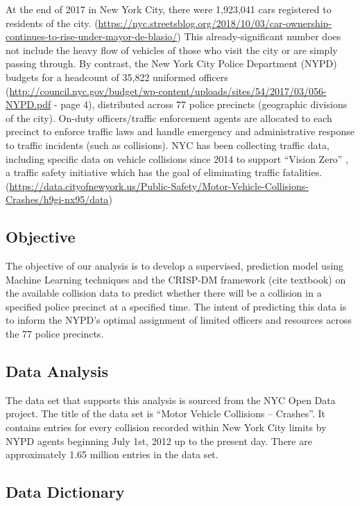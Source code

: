 At the end of 2017 in New York City, there were 1,923,041 cars
registered to residents of the city.
(\url{https://nyc.streetsblog.org/2018/10/03/car-ownership-continues-to-rise-under-mayor-de-blasio/})
This already-significant number does not include the heavy flow of
vehicles of those who visit the city or are simply passing through. By
contrast, the New York City Police Department (NYPD) budgets for a
headcount of 35,822 uniformed officers
(\url{http://council.nyc.gov/budget/wp-content/uploads/sites/54/2017/03/056-NYPD.pdf}
- page 4), distributed across 77 police precincts (geographic divisions
of the city). On-duty officers/traffic enforcement agents are allocated
to each precinct to enforce traffic laws and handle emergency and
administrative response to traffic incidents (such as collisions). NYC
has been collecting traffic data, including specific data on vehicle
collisions since 2014 to support ``Vision Zero'' , a traffic safety
initiative which has the goal of eliminating traffic fatalities.
(\url{https://data.cityofnewyork.us/Public-Safety/Motor-Vehicle-Collisions-Crashes/h9gi-nx95/data})

\hypertarget{objective}{%
\subsection{Objective}\label{objective}}

The objective of our analysis is to develop a supervised, prediction
model using Machine Learning techniques and the CRISP-DM framework (cite
textbook) on the available collision data to predict whether there will
be a collision in a specified police precinct at a specified time. The
intent of predicting this data is to inform the NYPD's optimal
assignment of limited officers and resources across the 77 police
precincts.

\hypertarget{data-analysis}{%
\subsection{Data Analysis}\label{data-analysis}}

The data set that supports this analysis is sourced from the NYC Open
Data project. The title of the data set is ``Motor Vehicle Collisions --
Crashes''. It contains entries for every collision recorded within New
York City limits by NYPD agents beginning July 1st, 2012 up to the
present day. There are approximately 1.65 million entries in the data
set.

\hypertarget{data-dictionary}{%
\subsection{Data Dictionary}\label{data-dictionary}}

